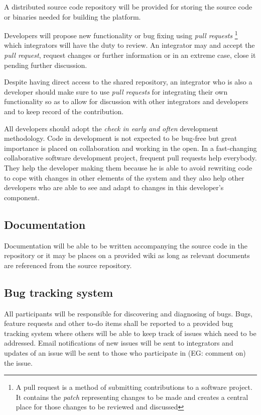 A distributed source code repository will be provided for storing the source code or binaries
needed for building the \learnpad platform.

Developers will propose new functionality or bug fixing using \emph{pull requests}
\footnote{A pull request is a method of submitting contributions to a software project.
It contains the \emph{patch} representing changes to be made and creates a central place
for those changes to be reviewed and discussed}
which integrators will have the duty to review. An integrator may and accept the
\emph{pull request}, request changes or further information or in an extreme case,
close it pending further discussion.

Despite having direct access to the shared repository, an integrator who is also a developer should
make sure to use \emph{pull requests} for integrating their own functionality so as to allow for
discussion with other integrators and developers and to keep record of the contribution.

All developers should adopt the \emph{check in early and often} development methodology.
Code in development is not expected to be bug-free but great importance is placed on collaboration
and working in the open. In a fast-changing collaborative software development project, frequent
pull requests help everybody. They help the developer making them because he is able to avoid
rewriting code to cope with changes in other elements of the system and they also help other
developers who are able to see and adapt to changes in this developer's component.

\subsection{Documentation}
\label{sec:documentation}

Documentation will be able to be written accompanying the source code in the repository or it
may be places on a provided wiki as long as relevant documents are referenced from the source
repository.

\subsection{Bug tracking system}
\label{sec:bug tracking-system}

All participants will be responsible for discovering and diagnosing of bugs. Bugs, feature
requests and other to-do items shall be reported to a provided bug tracking system where others
will be able to keep track of issues which need to be addressed. Email notifications of new
issues will be sent to integrators and updates of an issue will be sent to those who participate in
(EG: comment on) the issue.

